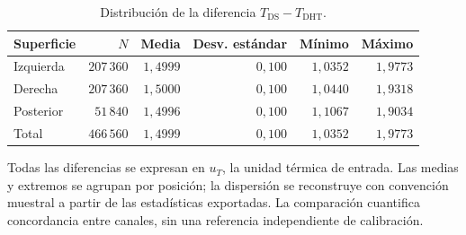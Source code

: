 \begin{table}[htbp]
\centering
\caption{Distribución de la diferencia $T_{\mathrm{DS}}-T_{\mathrm{DHT}}$.}
\label{tab:res_concordancia}
\small
\setlength{\tabcolsep}{5pt}
\begin{tabular}{lrrrrr}
\toprule
Superficie & $N$ & Media & Desv. estándar & Mínimo & Máximo \\
\midrule
Izquierda & $207\,360$ & $1{,}4999$ & $0{,}100$ & $1{,}0352$ & $1{,}9773$ \\
Derecha & $207\,360$ & $1{,}5000$ & $0{,}100$ & $1{,}0440$ & $1{,}9318$ \\
Posterior & $51\,840$ & $1{,}4996$ & $0{,}100$ & $1{,}1067$ & $1{,}9034$ \\
Total & $466\,560$ & $1{,}4999$ & $0{,}100$ & $1{,}0352$ & $1{,}9773$ \\
\bottomrule
\end{tabular}
\par\vspace{3pt}
\begin{minipage}{0.98\textwidth}\footnotesize
Todas las diferencias se expresan en $u_T$, la unidad térmica de entrada. Las medias y extremos se agrupan por posición; la dispersión se reconstruye con convención muestral a partir de las estadísticas exportadas. La comparación cuantifica concordancia entre canales, sin una referencia independiente de calibración.
\end{minipage}
\end{table}
